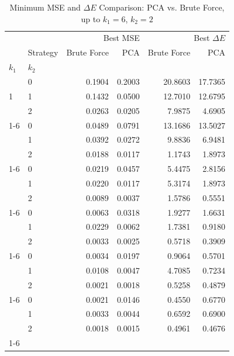 \begin{table}[htbp]
    \centering
    \begin{tabular}{llrrrr}
    \toprule
     &  & \multicolumn{2}{r}{Best MSE} & \multicolumn{2}{r}{Best $\Delta E$} \\
     & Strategy & Brute Force & PCA & Brute Force & PCA \\
    $k_1$ & $k_2$ &  &  &  &  \\
    \midrule
    \multirow[t]{3}{*}{1} & 0 & 0.1904 & 0.2003 & 20.8603 & 17.7365 \\
      & 1 & 0.1432 & 0.0500 & 12.7010 & 12.6795 \\
      & 2 & 0.0263 & 0.0205 & 7.9875 & 4.6905 \\
    \cline{1-6}
    \multirow[t]{3}{*}{2} & 0 & 0.0489 & 0.0791 & 13.1686 & 13.5027 \\
      & 1 & 0.0392 & 0.0272 & 9.8836 & 6.9481 \\
      & 2 & 0.0188 & 0.0117 & 1.1743 & 1.8973 \\
    \cline{1-6}
    \multirow[t]{3}{*}{3} & 0 & 0.0219 & 0.0457 & 5.4475 & 2.8156 \\
      & 1 & 0.0220 & 0.0117 & 5.3174 & 1.8973 \\
      & 2 & 0.0089 & 0.0037 & 1.5786 & 0.5551 \\
    \cline{1-6}
    \multirow[t]{3}{*}{4} & 0 & 0.0063 & 0.0318 & 1.9277 & 1.6631 \\
      & 1 & 0.0229 & 0.0062 & 1.7381 & 0.9180 \\
      & 2 & 0.0033 & 0.0025 & 0.5718 & 0.3909 \\
    \cline{1-6}
    \multirow[t]{3}{*}{5} & 0 & 0.0034 & 0.0197 & 0.9064 & 0.5701 \\
      & 1 & 0.0108 & 0.0047 & 4.7085 & 0.7234 \\
      & 2 & 0.0021 & 0.0018 & 0.5258 & 0.4879 \\
    \cline{1-6}
    \multirow[t]{3}{*}{6} & 0 & 0.0021 & 0.0146 & 0.4550 & 0.6770 \\
      & 1 & 0.0033 & 0.0044 & 0.6592 & 0.6900 \\
      & 2 & 0.0018 & 0.0015 & 0.4961 & 0.4676 \\
    \cline{1-6}
    \bottomrule
    \end{tabular}
    \caption{Minimum MSE and $\Delta E$ Comparison: PCA vs. Brute Force, up to $k_1=6$, $k_2=2$}
    \label{tab:mse_deltae_comparison}
\end{table}